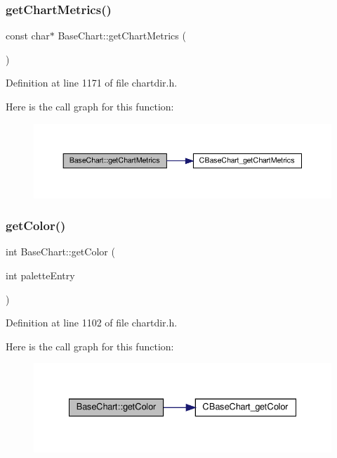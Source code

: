 \subsubsection{\texorpdfstring{get\+Chart\+Metrics()}{getChartMetrics()}}
{\footnotesize\ttfamily const char$\ast$ Base\+Chart\+::get\+Chart\+Metrics (\begin{DoxyParamCaption}{ }\end{DoxyParamCaption})\hspace{0.3cm}{\ttfamily [inline]}}



Definition at line 1171 of file chartdir.\+h.

Here is the call graph for this function\+:
\nopagebreak
\begin{figure}[H]
\begin{center}
\leavevmode
\includegraphics[width=350pt]{class_base_chart_a3dd3942f4e9685be181a34309a7f5b7d_cgraph}
\end{center}
\end{figure}
\mbox{\label{class_base_chart_a43e7e8f3ea4d05ec9976ee59ba9bd10e}} 
\subsubsection{\texorpdfstring{get\+Color()}{getColor()}}
{\footnotesize\ttfamily int Base\+Chart\+::get\+Color (\begin{DoxyParamCaption}\item[{int}]{palette\+Entry }\end{DoxyParamCaption})\hspace{0.3cm}{\ttfamily [inline]}}



Definition at line 1102 of file chartdir.\+h.

Here is the call graph for this function\+:
\nopagebreak
\begin{figure}[H]
\begin{center}
\leavevmode
\includegraphics[width=335pt]{class_base_chart_a43e7e8f3ea4d05ec9976ee59ba9bd10e_cgraph}
\end{center}
\end{figure}
\mbox{\label{class_base_chart_aa9314241244d1361b8cf0bac3e2242dd}} 
